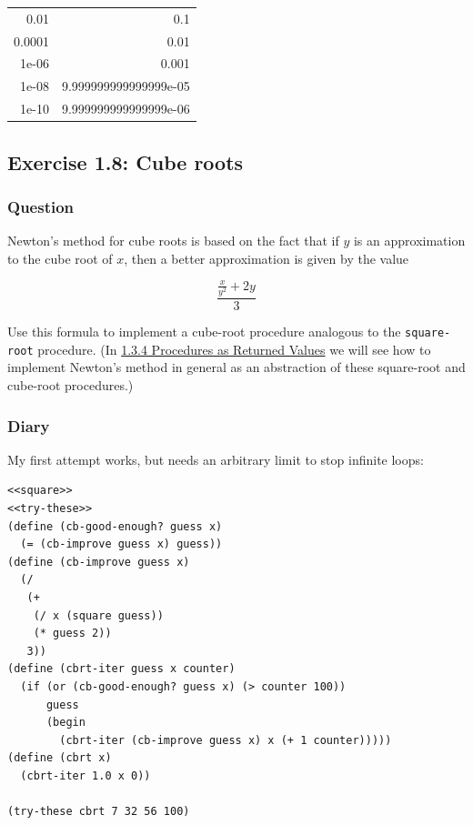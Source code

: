 \documentclass[final,fleqn,titlepage,twoside]{article}
\begin{document}
\begin{center}
\begin{tabular}{rr}
0.01 & 0.1\\[0pt]
0.0001 & 0.01\\[0pt]
1e-06 & 0.001\\[0pt]
1e-08 & 9.999999999999999e-05\\[0pt]
1e-10 & 9.999999999999999e-06\\[0pt]
\end{tabular}
\end{center}

\subsection{Exercise 1.8: Cube roots}
\label{sec:org0503efc}
\subsubsection{Question}
\label{sec:org05c3658}
Newton's method for cube roots is based on the fact that if \(y\) is an
approximation to the cube root of \(x\), then a better approximation is given by
the value

\[
\frac{\frac{x}{y^2} + 2y}{3}
\]

Use this formula to implement a cube-root procedure analogous to the
\texttt{square-root} procedure. (In \hyperref[sec:orgda8f430]{1.3.4 Procedures as Returned Values} we
will see how to implement Newton's method in general as an abstraction of these
square-root and cube-root procedures.)

\subsubsection{Diary}
\label{sec:orgb63ca58}
My first attempt works, but needs an arbitrary limit to stop infinite loops:
\begin{verbatim}
<<square>>
<<try-these>>
(define (cb-good-enough? guess x)
  (= (cb-improve guess x) guess))
(define (cb-improve guess x)
  (/
   (+
    (/ x (square guess))
    (* guess 2))
   3))
(define (cbrt-iter guess x counter)
  (if (or (cb-good-enough? guess x) (> counter 100))
      guess
      (begin
        (cbrt-iter (cb-improve guess x) x (+ 1 counter)))))
(define (cbrt x)
  (cbrt-iter 1.0 x 0))

(try-these cbrt 7 32 56 100)
\end{verbatim}
\end{document}
